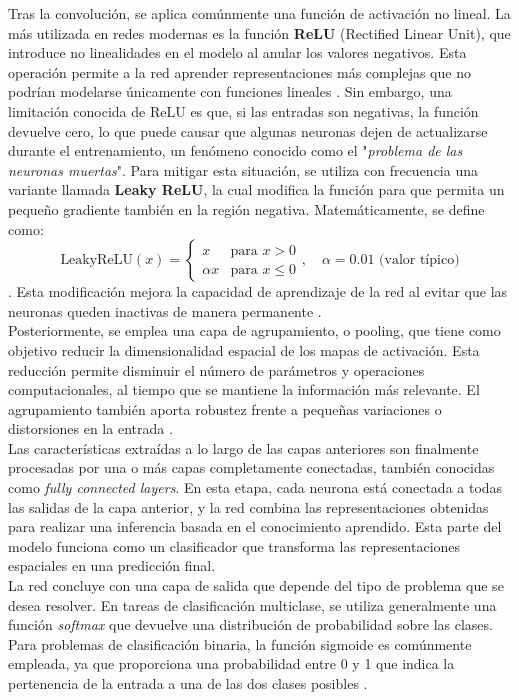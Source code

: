 \documentclass[12pt]{article} %
\begin{document}
Tras la convolución, se aplica comúnmente una función de activación no lineal. La más utilizada en redes modernas es la función \textbf{ReLU} (Rectified Linear Unit), que introduce no linealidades en el modelo al anular los valores negativos. Esta operación permite a la red aprender representaciones más complejas que no podrían modelarse únicamente con funciones lineales \cite{nair2010rectified}. Sin embargo, una limitación conocida de ReLU es que, si las entradas son negativas, la función devuelve cero, lo que puede causar que algunas neuronas dejen de actualizarse durante el entrenamiento, un fenómeno conocido como el "\textit{problema de las neuronas muertas}". Para mitigar esta situación, se utiliza con frecuencia una variante llamada \textbf{Leaky ReLU}, la cual modifica la función para que permita un pequeño gradiente también en la región negativa. Matemáticamente, se define como: \[
\text{LeakyReLU}(x) = 
\begin{cases} 
x & \text{para } x > 0 \\
\alpha x & \text{para } x \le 0 
\end{cases}, \quad
\alpha = 0.01 \text{ (valor típico)}
\]. Esta modificación mejora la capacidad de aprendizaje de la red al evitar que las neuronas queden inactivas de manera permanente \cite{maas2013rectifier}. \\

Posteriormente, se emplea una capa de agrupamiento, o pooling, que tiene como objetivo reducir la dimensionalidad espacial de los mapas de activación. Esta reducción permite disminuir el número de parámetros y operaciones computacionales, al tiempo que se mantiene la información más relevante. El agrupamiento también aporta robustez frente a pequeñas variaciones o distorsiones en la entrada \cite{sermanet2013overfeat}. \\

Las características extraídas a lo largo de las capas anteriores son finalmente procesadas por una o más capas completamente conectadas, también conocidas como \textit{fully connected layers}. En esta etapa, cada neurona está conectada a todas las salidas de la capa anterior, y la red combina las representaciones obtenidas para realizar una inferencia basada en el conocimiento aprendido. Esta parte del modelo funciona como un clasificador que transforma las representaciones espaciales en una predicción final.\\

La red concluye con una capa de salida que depende del tipo de problema que se desea resolver. En tareas de clasificación multiclase, se utiliza generalmente una función \textit{softmax} que devuelve una distribución de probabilidad sobre las clases. Para problemas de clasificación binaria, la función sigmoide es comúnmente empleada, ya que proporciona una probabilidad entre 0 y 1 que indica la pertenencia de la entrada a una de las dos clases posibles \cite{bishop2006pattern}.\\
\end{document}
